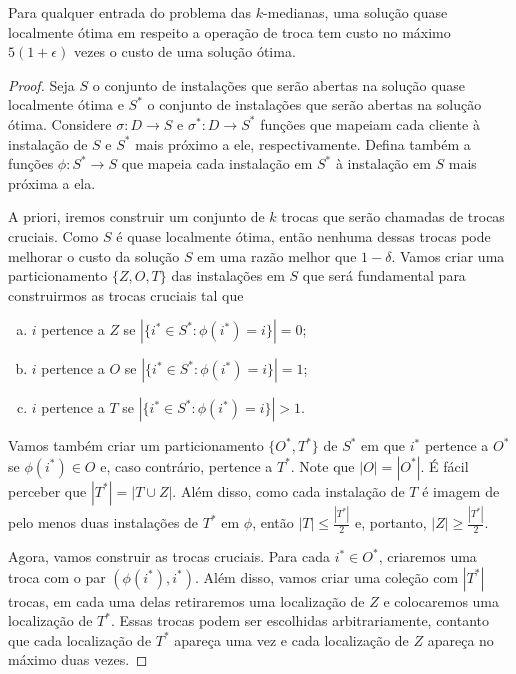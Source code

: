 \begin{theorem}
    Para qualquer entrada do problema das $k$-medianas, uma solução quase localmente ótima em respeito a operação de troca tem custo no máximo $5(1+\epsilon)$ vezes o custo de uma solução ótima.
\end{theorem}
\begin{proof}
Seja $S$ o conjunto de instalações que serão abertas na solução quase localmente ótima e $S^*$ o conjunto de instalações que serão abertas na solução ótima. Considere $\sigma: D\rightarrow S$ e $\sigma^* : D \rightarrow S^*$ funções que mapeiam cada cliente à instalação de $S$ e $S^*$ mais próximo a ele, respectivamente. Defina também a funções $\phi : S^* \rightarrow S$ que mapeia cada instalação em $S^*$ à instalação em $S$ mais próxima a ela.

A priori, iremos construir um conjunto de $k$ trocas que serão chamadas de trocas cruciais. Como $S$ é quase localmente ótima, então nenhuma dessas trocas pode melhorar o custo da solução $S$ em uma razão melhor que $ 1- \delta$. Vamos criar uma particionamento $\{Z,O,T\}$ das instalações em $S$ que será fundamental para construirmos as trocas cruciais tal que
\begin{enumerate}[a.]
\item $i$ pertence a $Z$ se $|\{i^* \in S^* : \phi(i^*) = i\}| = 0$;
\item $i$ pertence a $O$ se $|\{i^* \in S^* : \phi(i^*) = i\}| = 1$;
\item $i$ pertence a $T$ se $|\{i^* \in S^* : \phi(i^*) = i\}| > 1$.
\end{enumerate}
Vamos também criar um particionamento $\{O^*,T^*\}$ de $S^*$ em que $i^*$ pertence a $O^*$ se $\phi(i^*) \in O$ e, caso contrário, pertence a $T^*$. Note que $|O| = |O^*|$. É fácil perceber que $|T^*| = |T\cup Z|$. Além disso, como cada instalação de $T$ é imagem de pelo menos duas instalações de $T^*$ em $\phi$, então $|T| \leq \frac{|T^*|}{2}$ e, portanto, $|Z| \geq \frac{|T^*|}{2}$.

Agora, vamos construir as trocas cruciais. Para cada $i^* \in O^*$, criaremos uma troca com o par $(\phi(i^*),i^*)$. Além disso, vamos criar uma coleção com $|T^*|$ trocas, em cada uma delas retiraremos uma localização de $Z$ e colocaremos uma localização de $T^*$. Essas trocas podem ser escolhidas arbitrariamente, contanto que cada localização de $T^*$ apareça uma vez e cada localização de $Z$ apareça no máximo duas vezes.


\end{proof}
